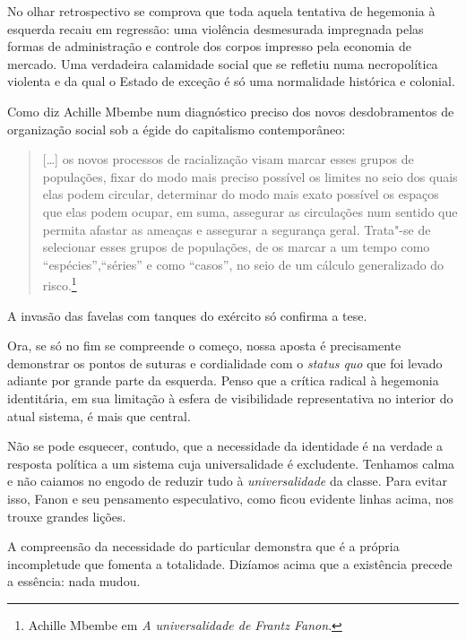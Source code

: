 No olhar retrospectivo se comprova que toda aquela tentativa de
hegemonia à esquerda recaiu em regressão: uma violência desmesurada
impregnada pelas formas de administração e controle dos corpos impresso
pela economia de mercado. Uma verdadeira calamidade social que se
refletiu numa necropolítica violenta e da qual o Estado de exceção é só
uma normalidade histórica e colonial.

Como diz Achille Mbembe num diagnóstico preciso dos novos desdobramentos
de organização social sob a égide do capitalismo contemporâneo:

\begin{quote}
{[}\ldots{}{]} os novos processos de racialização visam marcar esses grupos
de populações, fixar do modo mais preciso possível os limites no seio
dos quais elas podem circular, determinar do modo mais exato possível os
espaços que elas podem ocupar, em suma, assegurar as circulações num
sentido que permita afastar as ameaças e assegurar a segurança geral.
Trata"-se de selecionar esses grupos de populações, de os marcar a um
tempo como ``espécies'',``séries'' e como ``casos'', no seio de um cálculo
generalizado do risco.\footnote{Achille Mbembe em \emph{A universalidade
  de Frantz Fanon}.}
\end{quote}

A invasão das favelas com tanques do exército só confirma a tese.

Ora, se só no fim se compreende o começo, nossa aposta é precisamente
demonstrar os pontos de suturas e cordialidade com o \emph{status quo}
que foi levado adiante por grande parte da esquerda. Penso que a crítica
radical à hegemonia identitária, em sua limitação à esfera de
visibilidade representativa no interior do atual sistema, é mais que
central.

Não se pode esquecer, contudo, que a necessidade da identidade é na
verdade a resposta política a um sistema cuja universalidade é
excludente. Tenhamos calma e não caiamos no engodo de reduzir tudo à
\emph{universalidade} da classe. Para evitar isso, Fanon e seu
pensamento especulativo, como ficou evidente linhas acima, nos trouxe
grandes lições.

A compreensão da necessidade do particular demonstra que é a própria
incompletude que fomenta a totalidade. Dizíamos acima que a existência
precede a essência: nada mudou.

